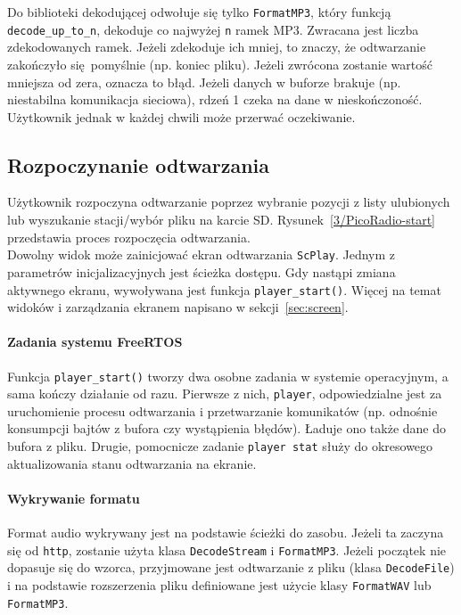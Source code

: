 \documentclass[polish]{aghengthesis}
\begin{document}
			Do biblioteki dekodującej odwołuje się tylko \lstinline|FormatMP3|, który funkcją \lstinline|decode_up_to_n|, dekoduje co najwyżej \lstinline|n| ramek MP3. Zwracana jest liczba zdekodowanych ramek. Jeżeli zdekoduje ich mniej, to znaczy, że odtwarzanie zakończyło się pomyślnie (np. koniec pliku). Jeżeli zwrócona zostanie wartość mniejsza od zera, oznacza to błąd. Jeżeli danych w buforze brakuje (np. niestabilna komunikacja sieciowa), rdzeń 1 czeka na dane w nieskończoność. Użytkownik jednak w każdej chwili może przerwać oczekiwanie.
		
		\subsection{Rozpoczynanie odtwarzania}
			Użytkownik rozpoczyna odtwarzanie poprzez wybranie pozycji z listy ulubionych lub wyszukanie stacji/wybór pliku na karcie SD.
			Rysunek~\ref{3/PicoRadio-start} przedstawia proces rozpoczęcia odtwarzania.
			$ $\\
			
			Dowolny widok może zainicjować ekran odtwarzania \lstinline|ScPlay|.
			Jednym z parametrów inicjalizacyjnych jest ścieżka dostępu. Gdy nastąpi zmiana aktywnego ekranu, wywoływana jest funkcja \lstinline|player_start()|. Więcej na temat widoków i zarządzania ekranem napisano w sekcji~\ref{sec:screen}.
			
			\paragraph{Zadania systemu FreeRTOS}
				Funkcja \lstinline|player_start()| tworzy dwa osobne zadania w systemie operacyjnym, a sama kończy działanie od razu. Pierwsze z nich, \lstinline|player|, odpowiedzialne jest za uruchomienie procesu odtwarzania i przetwarzanie komunikatów (np. odnośnie konsumpcji bajtów z bufora czy wystąpienia błędów). Ładuje ono także dane do bufora z pliku. Drugie, pomocnicze zadanie \lstinline|player stat| służy do okresowego aktualizowania stanu odtwarzania na ekranie.
			
			\paragraph{Wykrywanie formatu}
				Format audio wykrywany jest na podstawie ścieżki do zasobu. Jeżeli ta zaczyna się od \lstinline|http|, zostanie użyta klasa \lstinline|DecodeStream| i \lstinline|FormatMP3|. Jeżeli początek nie dopasuje się do wzorca, przyjmowane jest odtwarzanie z pliku (klasa \lstinline|DecodeFile|) i na podstawie rozszerzenia pliku definiowane jest użycie klasy \lstinline|FormatWAV| lub \lstinline|FormatMP3|.
				
\end{document}
